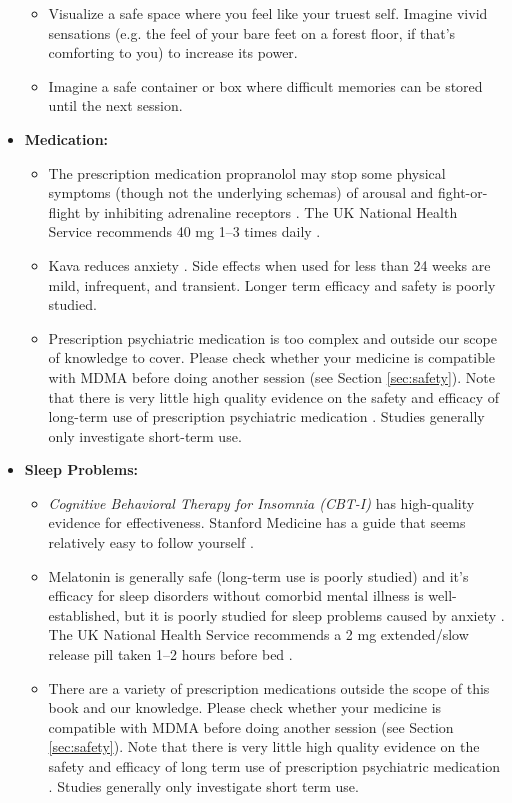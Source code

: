 \documentclass[12pt,letterpaper]{book}
\begin{document}
\begin{itemize}
\begin{itemize}
        \item Visualize a safe space where you feel like your truest self. Imagine vivid sensations (e.g. the feel of your bare feet on a forest floor, if that's comforting to you) to increase its power.
        \item Imagine a safe container or box where difficult memories can be stored until the next session.
    \end{itemize}
    \item \textbf{Medication:}
    \begin{itemize}
        \item The prescription medication propranolol may stop some physical symptoms (though not the underlying schemas) of arousal and fight-or-flight by inhibiting adrenaline receptors \cite{steenenPropranalol}. The UK National Health Service recommends 40 mg 1–3 times daily \cite{nhsPropranalol}.
        \item Kava reduces anxiety \cite{Pittler03kava}. Side effects when used for less than 24 weeks are mild, infrequent, and transient. Longer term efficacy and safety is poorly studied.
        \item Prescription psychiatric medication is too complex and outside our scope of knowledge to cover. Please check whether your medicine is compatible with MDMA before doing another session (see Section \ref{sec:safety}). Note that there is very little high quality evidence on the safety and efficacy of long-term use of prescription psychiatric medication \cite{leuchtDecline}. Studies generally only investigate short-term use.
    \end{itemize}
    \item \textbf{Sleep Problems:}
    \begin{itemize}
        \item \textit{Cognitive Behavioral Therapy for Insomnia (CBT-I)} has high-quality evidence for effectiveness. Stanford Medicine has a guide that seems relatively easy to follow yourself \cite{stanfordSleep}.
        \item Melatonin is generally safe (long-term use is poorly studied) and it's efficacy for sleep disorders without comorbid mental illness is well-established, but it is poorly studied for sleep problems caused by anxiety \cite{moon2022role}. The UK National Health Service recommends a 2 mg extended/slow release pill taken 1–2 hours before bed \cite{nhsMelatonin}.
        \item There are a variety of prescription medications outside the scope of this book and our knowledge. Please check whether your medicine is compatible with MDMA before doing another session (see Section \ref{sec:safety}). Note that there is very little high quality evidence on the safety and efficacy of long term use of prescription psychiatric medication \cite{leuchtDecline}. Studies generally only investigate short term use.

\end{itemize}
\end{itemize}
\end{document}
